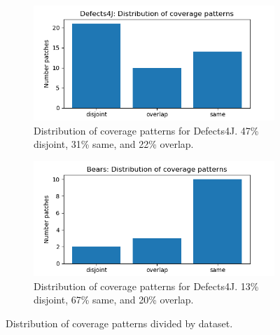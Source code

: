 \begin{figure}
	\begin{subfigure}{\linewidth}
		\includegraphics[width=\linewidth]{img/coverage-d4j.png}
		\caption{Distribution of coverage patterns for Defects4J. 47\% disjoint, 31\% same, and 22\% 
		overlap.}
	\end{subfigure}
	\begin{subfigure}{\linewidth}
		\includegraphics[width=\linewidth]{img/coverage-bears.png}
		\caption{Distribution of coverage patterns for Defects4J. 13\% disjoint, 67\% same, and 20\% 
		overlap.}
	\end{subfigure}
	\caption{Distribution of coverage patterns divided by dataset.}
	\label{fig:coverage-datasets}
\end{figure}


%

